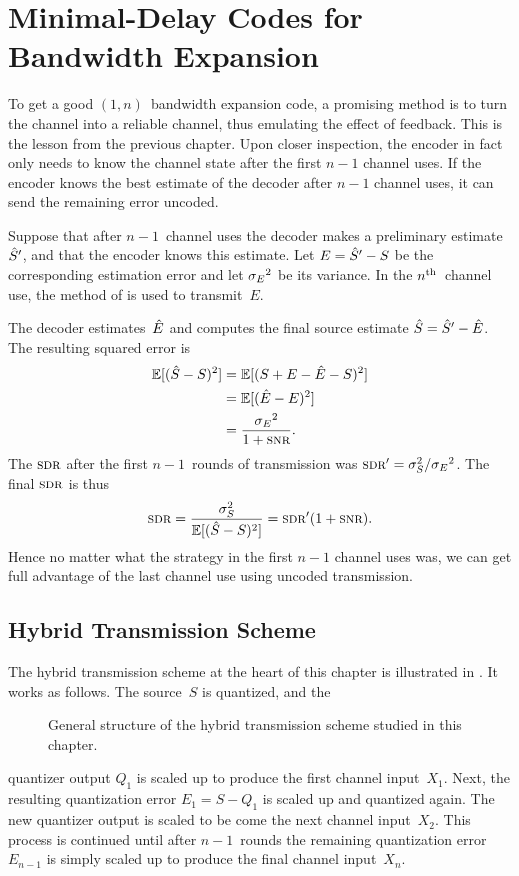 \chapter{Minimal-Delay Codes for Bandwidth Expansion}

To get a good $(1,n)$~bandwidth expansion code, a promising method is to turn
the channel into a reliable channel, thus emulating the effect of feedback. This
is the lesson from the previous chapter. Upon closer inspection, the encoder in
fact only needs to know the channel state after the first $n-1$ channel uses. If
the encoder knows the best estimate of the decoder after $n-1$ channel uses, it
can send the remaining error uncoded. 

Suppose that after $n-1$~channel uses the decoder makes a preliminary
estimate~${\hat{S}}'$, and that the encoder knows this estimate. Let $E = {\hat{S}}' - S$ be
the corresponding estimation error and let ${{\sigma_E}^2}$ be its variance. In the
$n{^{\text{th}}}$~channel use, the method of  is used to transmit~$E$.

The decoder estimates~$\hat{E}$ and computes the final source estimate ${\hat{S}} = {\hat{S}}' -
\hat{E}$. The resulting squared error is
\begin{align*}
  \E[(\Sh - S)^2] &= \E[(S + E - \Eh - S)^2] \\
  &= \E[(\Eh - E)^2] \\
  &= \frac{\seq}{1 + \snr}.
\end{align*}
The $\sdr$ after the first $n-1$~rounds of transmission was $\sdr' = \ssq/\seq$.
The final $\sdr$ is thus
\begin{equation*}
  \sdr = \frac{\ssq}{\E[(\Sh - S)^2]} = \sdr' (1 + \snr).
\end{equation*}
Hence no matter what the strategy in the first $n-1$ channel uses was, we can
get full advantage of the last channel use using uncoded transmission.


\section{Hybrid Transmission Scheme}\label{sec:hybridscheme}

The hybrid transmission scheme at the heart of this chapter is illustrated in
. It works as follows. The source~$S$ is quantized, and the
\begin{figure}[tbp]
  \begin{center}
    
  \end{center}
  \caption{General structure of the hybrid transmission scheme studied in this
  chapter.}
  \label{fig:qeschemegen}
\end{figure}
quantizer output $Q_1$ is scaled up to produce the first channel input~$X_1$.
Next, the resulting quantization error $E_1 = S - Q_1$ is scaled up and
quantized again. The new quantizer output is scaled to be come the next channel
input~$X_2$. This process is continued until after $n-1$~rounds the remaining
quantization error~$E_{n-1}$ is simply scaled up to produce the final channel
input~$X_n$. 


